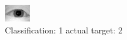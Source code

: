 \begin{figure}[h!]
\begin{center}
\includegraphics[width=0.60\columnwidth]{figures/ID868_class_1_target_2.png}
\end{center}
\caption{ Classification: 1 actual target: 2}
\label{fig:ID868_class_1_target_2}
\end{figure}
